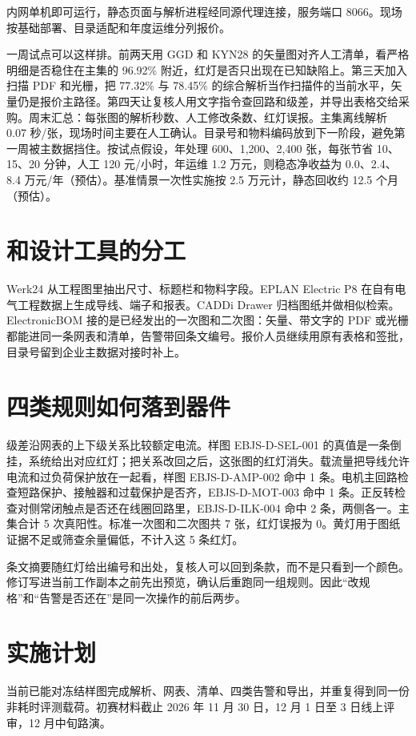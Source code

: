 内网单机即可运行，静态页面与解析进程经同源代理连接，服务端口 8066。现场按基础部署、目录适配和年度运维分列报价。

一周试点可以这样排。前两天用 GGD 和 KYN28 的矢量图对齐人工清单，看严格明细是否稳住在主集的 96.92\% 附近，红灯是否只出现在已知缺陷上。第三天加入扫描 PDF 和光栅，把 77.32\% 与 78.45\% 的综合解析当作扫描件的当前水平，矢量仍是报价主路径。第四天让复核人用文字指令查回路和级差，并导出表格交给采购。周末汇总：每张图的解析秒数、人工修改条数、红灯误报。主集离线解析 0.07 秒/张，现场时间主要在人工确认。目录号和物料编码放到下一阶段，避免第一周被主数据挡住。按试点假设，年处理 600、1{,}200、2{,}400 张，每张节省 10、15、20 分钟，人工 120 元/小时，年运维 1.2 万元，则稳态净收益为 0.0、2.4、8.4 万元/年（预估）。基准情景一次性实施按 2.5 万元计，静态回收约 12.5 个月（预估）。

\section{和设计工具的分工}
Werk24 从工程图里抽出尺寸、标题栏和物料字段。EPLAN Electric P8 在自有电气工程数据上生成导线、端子和报表。CADDi Drawer 归档图纸并做相似检索。ElectronicBOM 接的是已经发出的一次图和二次图：矢量、带文字的 PDF 或光栅都能进同一条网表和清单，告警带回条文编号。报价人员继续用原有表格和签批，目录号留到企业主数据对接时补上。

\section{四类规则如何落到器件}
级差沿网表的上下级关系比较额定电流。样图 EBJS-D-SEL-001 的真值是一条倒挂，系统给出对应红灯；把关系改回之后，这张图的红灯消失。载流量把导线允许电流和过负荷保护放在一起看，样图 EBJS-D-AMP-002 命中 1 条。电机主回路检查短路保护、接触器和过载保护是否齐，EBJS-D-MOT-003 命中 1 条。正反转检查对侧常闭触点是否还在线圈回路里，EBJS-D-ILK-004 命中 2 条，两侧各一。主集合计 5 次真阳性。标准一次图和二次图共 7 张，红灯误报为 0。黄灯用于图纸证据不足或筛查余量偏低，不计入这 5 条红灯。

条文摘要随红灯给出编号和出处，复核人可以回到条款，而不是只看到一个颜色。修订写进当前工作副本之前先出预览，确认后重跑同一组规则。因此“改规格”和“告警是否还在”是同一次操作的前后两步。

\clearpage
\section{实施计划}
当前已能对冻结样图完成解析、网表、清单、四类告警和导出，并重复得到同一份非耗时评测载荷。初赛材料截止 2026 年 11 月 30 日，12 月 1 日至 3 日线上评审，12 月中旬路演。

